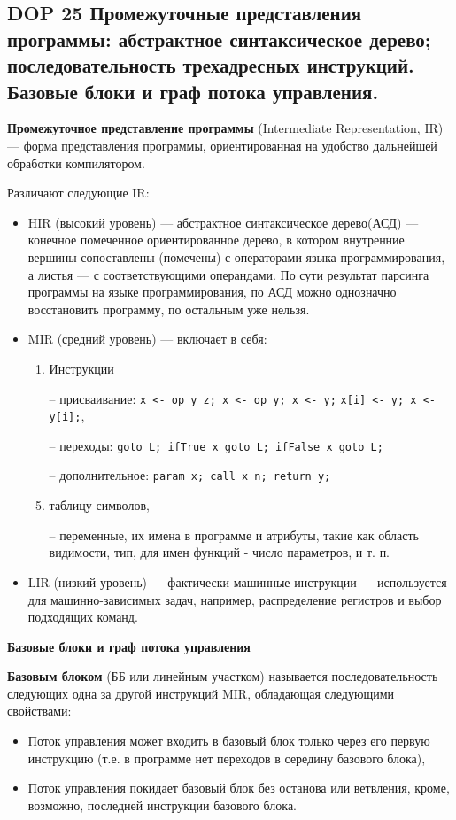 \subsection{DOP 25 Промежуточные  представления  программы:  абстрактное  синтаксическое  дерево;  последовательность трехадресных инструкций. Базовые блоки и граф потока управления.}

\textbf{Промежуточное представление программы} (Intermediate Representation, IR) --- форма представления программы, ориентированная на удобство дальнейшей обработки компилятором.

Различают следующие IR:
\begin{itemize}
    \item HIR (высокий уровень) --- абстрактное синтаксическое дерево(АСД) --- конечное помеченное ориентированное дерево, в котором внутренние вершины сопоставлены (помечены) с операторами языка программирования, а листья --- с соответствующими операндами. По сути результат парсинга программы на языке программирования, по АСД можно однозначно восстановить программу, по остальным уже нельзя.
    \item MIR (средний уровень) --- включает в себя:
    \begin{enumerate}
        \item Инструкции
        \item[--] присваивание: \texttt{x <- op y z; x <- op y; x <- y;}
        \texttt{x[i] <- y; x <- y[i];},
        \item[--] переходы: \texttt{goto L; ifTrue x goto L; ifFalse x goto L;}
        \item[--] дополнительное: \texttt{param x; call x n; return y;}
        \item таблицу символов,
        \item[--] переменные, их имена в программе и атрибуты, такие как область видимости, тип, для имен функций - число параметров, и т. п.
    \end{enumerate}
    \item LIR (низкий уровень) --- фактически машинные инструкции --- используется для машинно-зависимых задач, например, распределение регистров и выбор подходящих команд.
\end{itemize}

\textbf{Базовые блоки и граф потока управления}

\textbf{Базовым блоком} (ББ или линейным участком) называется последовательность следующих одна за другой инструкций MIR, обладающая следующими свойствами:
\begin{itemize}
    \item Поток управления может входить в базовый блок только через его первую инструкцию (т.е. в программе нет переходов в середину базового блока),
    \item Поток управления покидает базовый блок без останова или ветвления, кроме, возможно, последней инструкции базового блока.
\end{itemize}

